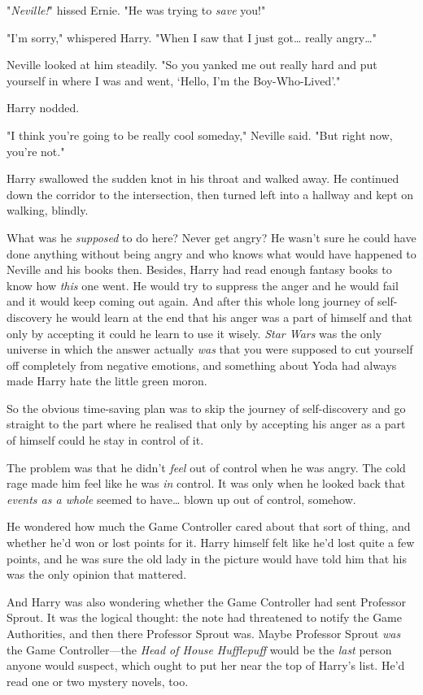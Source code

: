 "\emph{Neville!}" hissed Ernie. "He was trying to \emph{save} you!"

"I'm sorry," whispered Harry. "When I saw that I just got{\ldots} really 
angry{\ldots}"

Neville looked at him steadily. "So you yanked me out really hard and put 
yourself in where I was and went, `Hello, I'm the Boy-Who-Lived'."

Harry nodded.

"I think you're going to be really cool someday," Neville said. "But right now, 
you're not."

Harry swallowed the sudden knot in his throat and walked away. He continued 
down the corridor to the intersection, then turned left into a hallway and kept 
on walking, blindly.

What was he \emph{supposed} to do here? Never get angry? He wasn't sure he 
could have done anything without being angry and who knows what would have 
happened to Neville and his books then. Besides, Harry had read enough fantasy 
books to know how \emph{this} one went. He would try to suppress the anger and 
he would fail and it would keep coming out again. And after this whole long 
journey of self-discovery he would learn at the end that his anger was a part 
of himself and that only by accepting it could he learn to use it wisely. 
\emph{Star Wars} was the only universe in which the answer actually \emph{was} 
that you were supposed to cut yourself off completely from negative emotions, 
and something about Yoda had always made Harry hate the little green moron.

So the obvious time-saving plan was to skip the journey of self-discovery and 
go straight to the part where he realised that only by accepting his anger as a 
part of himself could he stay in control of it.

The problem was that he didn't \emph{feel} out of control when he was angry. 
The cold rage made him feel like he was \emph{in} control. It was only when he 
looked back that \emph{events as a whole} seemed to have{\ldots} blown up out 
of control, somehow.

He wondered how much the Game Controller cared about that sort of thing, and 
whether he'd won or lost points for it. Harry himself felt like he'd lost quite 
a few points, and he was sure the old lady in the picture would have told him 
that his was the only opinion that mattered.

And Harry was also wondering whether the Game Controller had sent Professor 
Sprout. It was the logical thought: the note had threatened to notify the Game 
Authorities, and then there Professor Sprout was. Maybe Professor Sprout 
\emph{was} the Game Controller---the \emph{Head of House Hufflepuff} would be 
the \emph{last} person anyone would suspect, which ought to put her near the 
top of Harry's list. He'd read one or two mystery novels, too.

